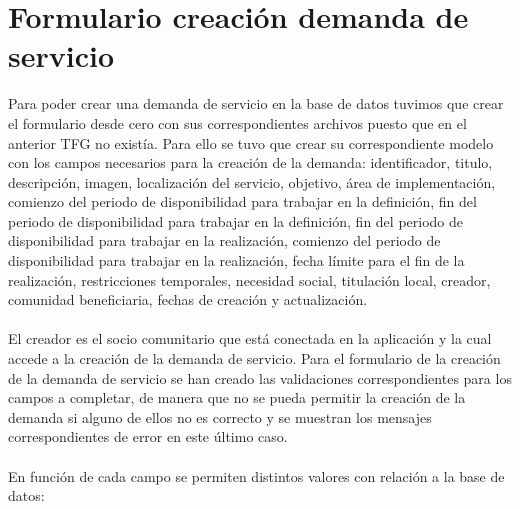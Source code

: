\documentclass[11pt]{book}
\begin{document}
	\section{Formulario creación demanda de servicio}
	Para poder crear una demanda de servicio en la base de datos tuvimos que crear el formulario desde cero con sus correspondientes archivos puesto que en el anterior TFG no existía. Para ello se tuvo que crear su correspondiente modelo con los campos necesarios para la creación de la demanda: identificador, titulo, descripción, imagen, localización del servicio, objetivo, área de implementación, comienzo del periodo de disponibilidad para trabajar en la definición, fin del periodo de disponibilidad para trabajar en la definición, fin del periodo de disponibilidad para trabajar en la realización, comienzo del periodo de disponibilidad para trabajar en la realización, fecha límite para el fin de la realización, restricciones temporales, necesidad social, titulación local, creador, comunidad beneficiaria, fechas de creación y actualización.\\\\
	El creador es el socio comunitario que está conectada en la aplicación y la cual accede a la creación de la demanda de servicio.
	Para el formulario de la creación de la demanda de servicio se han creado las validaciones correspondientes para los campos a completar, de manera que no se pueda permitir la creación de la demanda si alguno de ellos no es correcto y se muestran los mensajes correspondientes de error en este último caso.\\\\
	En función de cada campo se permiten distintos valores con relación a la base de datos: \\
\end{document}
